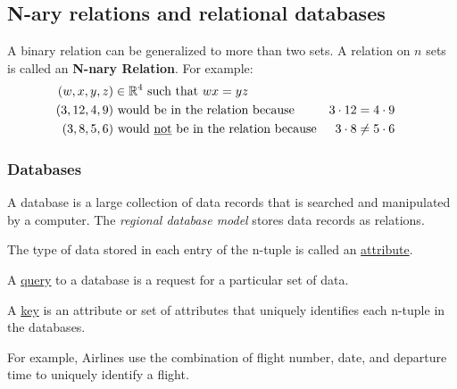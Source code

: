 \subsection{N-ary relations and relational databases}
A binary relation can be generalized to more than two sets. A relation on $n$ sets is called an \textbf{N-nary Relation}.
For example:
\begin{align*}
  (w,x,y,z)  & \in \mathbb{R}^4~\text{such that}~wx=yz                                                  \\
  (3,12,4,9) & ~\text{would be in the relation because}                 & 3 \cdot 12 & = 4 \cdot 9      \\
  (3,8,5,6)  & ~\text{would \underline{not} be in the relation because} & 3 \cdot 8  & \not = 5 \cdot 6
\end{align*}

\subsubsection*{Databases}
A database is a large collection of data records that is searched and manipulated by a computer.
The \textit{regional database model} stores data records as relations.

The type of data stored in each entry of the n-tuple is called an \underline{attribute}.

A \underline{query} to a database is a request for a particular set of data.

A \underline{key} is an attribute or set of attributes that uniquely identifies each n-tuple in the databases.

For example, Airlines use the combination of flight number, date, and departure time to uniquely identify a flight.

